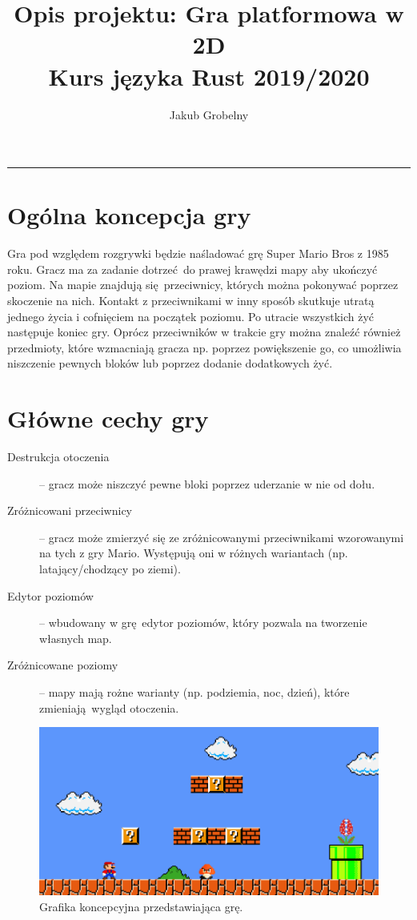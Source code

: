 \documentclass[12pt, a4paper, oneside]{article}
\title{%
    \textbf{Opis projektu: Gra platformowa w 2D} \\
    \large Kurs języka Rust 2019/2020
}
\author{\Large Jakub Grobelny}
\date{}
\begin{document}
\begin{titlepage}
    \maketitle
\end{titlepage}

\noindent\rule{\textwidth}{1pt}

\section*{Ogólna koncepcja gry}

Gra pod względem rozgrywki będzie naśladować grę Super Mario Bros z 1985 roku. 
Gracz ma za zadanie dotrzeć do prawej krawędzi mapy aby ukończyć poziom. Na 
mapie znajdują się przeciwnicy, których można pokonywać poprzez skoczenie na 
nich. Kontakt z przeciwnikami w inny sposób skutkuje utratą jednego życia i 
cofnięciem na początek poziomu. Po utracie wszystkich żyć następuje koniec gry. 
Oprócz przeciwników w trakcie gry można znaleźć również przedmioty, które 
wzmacniają gracza np. poprzez powiększenie go, co umożliwia niszczenie pewnych 
bloków lub poprzez dodanie dodatkowych żyć.

\section*{Główne cechy gry}

\begin{description}
    \item[Destrukcja otoczenia] -- gracz może niszczyć pewne bloki poprzez 
    uderzanie w nie od dołu.
    \item[Zróżnicowani przeciwnicy] -- gracz może zmierzyć się ze 
    zróżnicowanymi przeciwnikami wzorowanymi na tych z gry Mario. Występują oni 
    w różnych wariantach (np. latający/chodzący po ziemi).
    \item[Edytor poziomów] -- wbudowany w grę edytor poziomów, który pozwala na 
    tworzenie własnych map.
    \item[Zróżnicowane poziomy] -- mapy mają rożne warianty (np. podziemia, noc,
     dzień), które zmieniają wygląd otoczenia.
\end{description}

\begin{figure}
    \includegraphics[scale=0.4]{img/game.png}
    \caption{Grafika koncepcyjna przedstawiająca grę.}
\end{figure}
\end{document}

